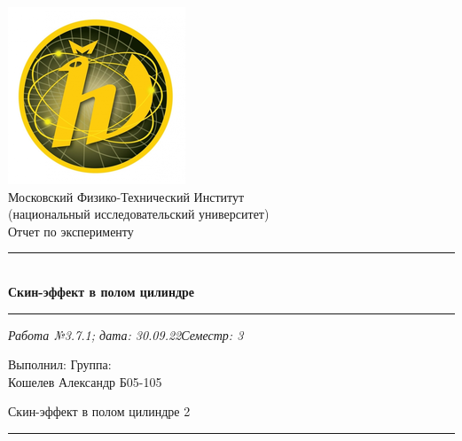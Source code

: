 \documentclass[12pt,a4paper]{scrartcl}
\begin{document}
	\begin{titlepage}
		
		\vspace*{\fill}
		
		\begin{center}
			\includegraphics[scale=0.8]{MIPT.png}
			\\[0.7cm]\Huge Московский Физико-Технический Институт\\(национальный исследовательский университет)
			\\[2cm]\LARGE Отчет по эксперименту
			\\[0.5cm]\noindent\rule{\textwidth}{1pt}
			\\\Huge\textbf{Скин-эффект в полом цилиндре}
			\\[-0.5cm]\noindent\rule{\textwidth}{1pt}
		\end{center}
		
		\begin{flushleft}
			\textit{Работа №3.7.1; дата: 30.09.22}\hfill\textit{Семестр: 3}
		\end{flushleft}
		
		\vspace*{\fill}
		
		\begin{flushleft}
			Выполнил: \hspace{\fill} Группа:
			\\Кошелев Александр \hspace{\fill} Б05-105
		\end{flushleft}
	\end{titlepage}
	
	
	\begin{flushleft}
		\footnotesize{Скин-эффект в полом цилиндре} \hspace{\fill} \footnotesize{2}
		\\[-0.3cm]\noindent\rule{\textwidth}{0.3pt}
	\end{flushleft}
	
\end{document}
